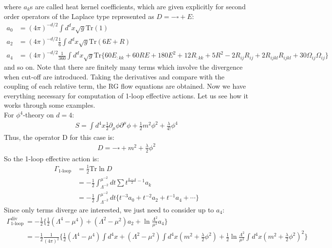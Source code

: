 \documentclass[fleqn]{article}
\begin{document}
where $a_k$s are called heat kernel coefficients, which are given explicitly for second order operators of the Laplace type represented as $D = -\square + E$:
\begin{align}
 a_{0} &= (4\pi)^{-d/2} \int d^{d}x \sqrt{g} \text{Tr} (1) \\
 a_{2} &= (4\pi)^{-d/2} \frac{1}{6}\int d^{d}x \sqrt{g} \text{Tr} (6E + R) \\
 a_{4} &= (4\pi)^{-d/2} \frac{1}{360} \int d^{d}x \sqrt{g} \text{Tr} \lbrace 60E_{:kk} + 60RE + 180E^{2} + 12R_{:kk} + 5R^{2} -2R_{ij}R_{ij} + 2R_{ijkl}R_{ijkl} + 30\Omega_{ij}\Omega_{ij} \rbrace
\end{align}
and so on. Note that there are finitely many terms which involve the divergence when cut-off are introduced. Taking the derivatives and compare with the coupling of each relative term, the RG flow equations are obtained. Now we have everything necessary for computation of 1-loop effective actions. Let us see how it works through some examples. \\
\indent For $\phi ^{4}$-theory on $d=4$:
\begin{align}
S = \int d^{4} x \frac{1}{2} \partial _{\mu} \phi \partial^{\mu} \phi + \frac{1}{2} m^{2} \phi^{2} +\frac{\lambda}{4!}\phi^{4}
\end{align}
Thus, the operator D for this case is:
\begin{align}
D = -\square + m^{2} + \frac{\lambda}{2}\phi ^{2}
\end{align}
So the 1-loop effective action is:
\begin{align}
\Gamma _{\text{1-loop}} &= \frac{1}{2}\text{Tr} \ln D \nonumber \\
&= -\frac{1}{2} \int _{\Lambda ^{-2}} ^{\mu ^{-2}} dt \sum t^{\frac{k-4}{2} -1} a_{k} \nonumber \\
&= -\frac{1}{2} \int _{\Lambda ^{-2}} ^{\mu ^{-2}} dt \lbrace t^{-3} a_0 + t^{-2} a_2 + t^{-1} a_4 + \cdots \rbrace
\end{align}
Since only terms diverge are interested, we just need to consider up to $a_4$:
\begin{align}
\Gamma _{\text{1-loop}}^{\text{div}} &= -\frac{1}{2} \lbrace \frac{1}{2} (\Lambda ^{4} - \mu ^{4}) + (\Lambda ^{2} - \mu^{2} )a_{2} + \ln \frac{\Lambda ^{2}}{\mu ^{2}}a_4 \rbrace \nonumber \\
&= -\frac{1}{2} \frac{1}{(4\pi)^2}\lbrace \frac{1}{2} (\Lambda ^{4} - \mu ^{4})\int d^{4}x +(\Lambda ^{2} - \mu^{2} )\int d^{4}x (m^{2} + \frac{\lambda}{2} \phi^2) +  \frac{1}{2}\ln \frac{\Lambda ^{2}}{\mu ^{2}} \int d^{4}x (m^{2} + \frac{\lambda}{2} \phi^2)^2 \rbrace
\end{align}
\end{document}
